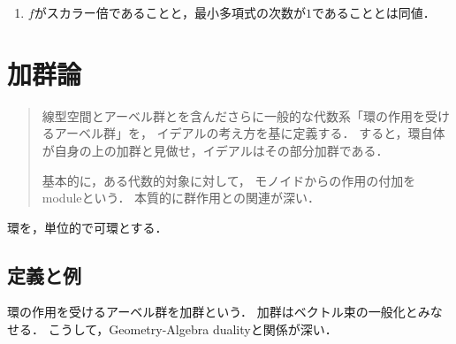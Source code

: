 \documentclass[uplatex,dvipdfmx]{jsreport}
\begin{document}
\begin{example}[スカラー倍の最小多項式]\mbox{}
    \begin{enumerate}
        \item $f$がスカラー倍であることと，最小多項式の次数が$1$であることとは同値．
    \end{enumerate}
    
\end{example}

\chapter{加群論}

\begin{quotation}
    線型空間とアーベル群とを含んださらに一般的な代数系「環の作用を受けるアーベル群」を，
    イデアルの考え方を基に定義する．
    すると，環自体が自身の上の加群と見做せ，イデアルはその部分加群である．
    
    基本的に，ある代数的対象に対して，
    モノイドからの作用の付加をmoduleという．
    本質的に群作用との関連が深い．
\end{quotation}

\begin{notation*}
    環を，単位的で可環とする．
\end{notation*}

\section{定義と例}

\begin{tcolorbox}[colframe=ForestGreen, colback=ForestGreen!10!white,breakable,colbacktitle=ForestGreen!40!white,coltitle=black,fonttitle=\bfseries\sffamily,
title=]
    環の作用を受けるアーベル群を加群という．
    加群はベクトル束の一般化とみなせる．
    こうして，Geometry-Algebra dualityと関係が深い．
\end{tcolorbox}
\end{document}
